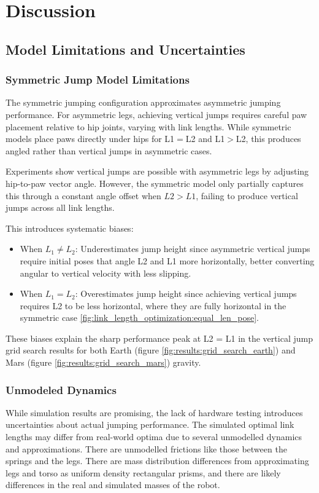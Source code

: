 \section{Discussion}

\subsection{Model Limitations and Uncertainties}

\subsubsection{Symmetric Jump Model Limitations}
The symmetric jumping configuration approximates asymmetric jumping performance. For asymmetric legs, achieving vertical jumps requires careful paw placement relative to hip joints, varying with link lengths. While symmetric models place paws directly under hips for L1$=$L2 and L1$>$L2, this produces angled rather than vertical jumps in asymmetric cases.

Experiments show vertical jumps are possible with asymmetric legs by adjusting hip-to-paw vector angle. However, the symmetric model only partially captures this through a constant angle offset when $L2 > L1$, failing to produce vertical jumps across all link lengths.

This introduces systematic biases:
\begin{itemize}
    \item When \(L_1 \neq L_2\): Underestimates jump height since asymmetric vertical jumps require initial poses that angle L2 and L1 more horizontally, better converting angular to vertical velocity with less slipping.
    \item When \(L_1 = L_2\): Overestimates jump height since achieving vertical jumps requires L2 to be less horizontal, where they are fully horizontal in the symmetric case \ref{fig:link_length_optimization:equal_len_pose}.
\end{itemize}

These biases explain the sharp performance peak at L2 = L1 in the vertical jump grid search results  for both Earth (figure \ref{fig:results:grid_search_earth}) and Mars (figure \ref{fig:results:grid_search_mars}) gravity.

\subsubsection{Unmodeled Dynamics}
While simulation results are promising, the lack of hardware testing introduces uncertainties about actual jumping performance. The 
simulated optimal link lengths may differ from real-world optima due to several unmodelled dynamics and approximations. There are 
unmodelled frictions like those between the springs and the legs. There are mass distribution differences from approximating legs and 
torso as uniform density rectangular prisms, and there are likely differences in the real and simulated masses of the robot.

